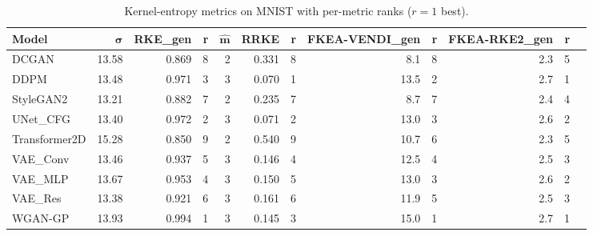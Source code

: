 \begin{table}[H]
\centering
\small
\caption{Kernel-entropy metrics on MNIST with per-metric ranks ($r{=}1$ best).}
\label{tab:ke-mnist-ranked}
\begin{tabular}{lrrrrrrrrrrr}
\toprule
\textbf{Model} & $\boldsymbol{\sigma}$ & \textbf{RKE\_gen} & \textbf{r} & $\boldsymbol{\hat m}$ & \textbf{RRKE} & \textbf{r} & \textbf{FKEA-VENDI\_gen} & \textbf{r} & \textbf{FKEA-RKE2\_gen} & \textbf{r} \\
\midrule
DCGAN         & 13.58 & 0.869 & 8 & 2 & 0.331 & 8 &  8.1 & 8 & 2.3 & 5 \\
DDPM          & 13.48 & 0.971 & 3 & 3 & 0.070 & 1 & 13.5 & 2 & 2.7 & 1 \\
StyleGAN2     & 13.21 & 0.882 & 7 & 2 & 0.235 & 7 &  8.7 & 7 & 2.4 & 4 \\
UNet\_CFG     & 13.40 & 0.972 & 2 & 3 & 0.071 & 2 & 13.0 & 3 & 2.6 & 2 \\
Transformer2D & 15.28 & 0.850 & 9 & 2 & 0.540 & 9 & 10.7 & 6 & 2.3 & 5 \\
VAE\_Conv     & 13.46 & 0.937 & 5 & 3 & 0.146 & 4 & 12.5 & 4 & 2.5 & 3 \\
VAE\_MLP      & 13.67 & 0.953 & 4 & 3 & 0.150 & 5 & 13.0 & 3 & 2.6 & 2 \\
VAE\_Res      & 13.38 & 0.921 & 6 & 3 & 0.161 & 6 & 11.9 & 5 & 2.5 & 3 \\
WGAN-GP        & 13.93 & 0.994 & 1 & 3 & 0.145 & 3 & 15.0 & 1 & 2.7 & 1 \\
\bottomrule
\end{tabular}
\end{table}


